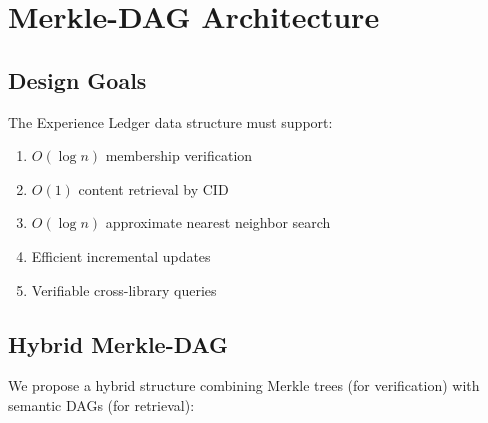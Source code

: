 \section{Merkle-DAG Architecture}

\label{sec:merkle}

\subsection{Design Goals}

The Experience Ledger data structure must support:

\begin{enumerate}
    \item $O(\log n)$ membership verification
    \item $O(1)$ content retrieval by CID
    \item $O(\log n)$ approximate nearest neighbor search
    \item Efficient incremental updates
    \item Verifiable cross-library queries
\end{enumerate}

\subsection{Hybrid Merkle-DAG}

We propose a hybrid structure combining Merkle trees (for verification) with semantic DAGs (for retrieval):

